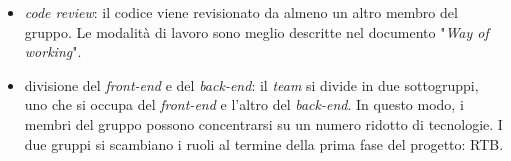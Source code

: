 \begin{itemize}
\begin{itemize}
		      \item \textit{code review}: il codice viene revisionato da
		            almeno un altro membro del gruppo. Le modalità di lavoro
		            sono meglio descritte nel documento "\textit{Way of
			            working}".

		      \item divisione del \textit{front-end} e del
		            \textit{back-end}: il \textit{team} si divide in due
		            sottogruppi, uno che si occupa del \textit{front-end} e
		            l'altro del \textit{back-end}. In questo modo, i membri
		            del gruppo possono concentrarsi su un numero ridotto di
		            tecnologie. I due gruppi si scambiano i ruoli al termine
		            della prima fase del progetto: RTB.
	      \end{itemize}
\end{itemize}
